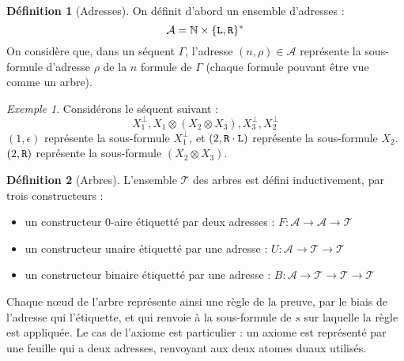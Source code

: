 \documentclass[11pt,a4paper]{article}
\theoremstyle{plain}
\theoremstyle{definition}
\newtheorem{definition}{Définition}
\theoremstyle{remark}
\newtheorem{example}{Exemple}
\newcommand*{\orth}{^\perp}
\newcommand*{\tensor}{\otimes}
\newcommand*{\sequent}{\Gamma}
\newcommand*{\Left}{\textnormal{\texttt{L}}}
\newcommand*{\Right}{\textnormal{\texttt{R}}}
\newcommand*{\trees}{\ensuremath{\mathcal{T}}}
\begin{document}
\begin{definition}[Adresses]
On définit d'abord un ensemble d'adresses :
\begin{equation*}
\mathcal{A} = \mathbb{N} \times \{ \Left, \Right\}^{*}  
\end{equation*}
On considère que, dans un séquent $\sequent$, l'adresse $(n, \rho) \in \mathcal{A}$ représente la sous-formule d'adresse $\rho$ de la $n$\ieme{} formule de $\sequent$ (chaque formule pouvant être vue comme un arbre).
\end{definition}

\begin{example}
Considérons le séquent suivant : 
\begin{equation*}
X_1\orth, X_1 \tensor (X_2 \tensor X_3), X_3\orth, X_2\orth
\end{equation*}
$(1, \epsilon)$ représente la sous-formule $X_1\orth$, et $(2, \Right \cdot \Left)$ représente la sous-formule $X_2$. $(2, \Right)$ représente la sous-formule $(X_2 \tensor X_3)$.
\end{example}

\begin{definition}[Arbres]
L'ensemble \trees{} des arbres est défini inductivement, par trois constructeurs :
\begin{itemize}
  \item un constructeur 0-aire étiquetté par deux adresses : $F: \mathcal{A} \rightarrow \mathcal{A} \rightarrow \trees$
  \item un constructeur unaire étiquetté par une adresse : $U: \mathcal{A} \rightarrow \trees \rightarrow \trees$
  \item un constructeur binaire étiquetté par une adresse : $B: \mathcal{A} \rightarrow \trees \rightarrow \trees \rightarrow \trees$
\end{itemize}
\end{definition}

Chaque n\oe ud de l'arbre représente ainsi une règle de la preuve, par le biais de l'adresse qui l'étiquette, et qui renvoie à la sous-formule de $s$ sur laquelle la règle est appliquée. Le cas de l'axiome est particulier : un axiome est représenté par une feuille qui a deux adresses, renvoyant aux deux atomes duaux utilisés.
\end{document}
